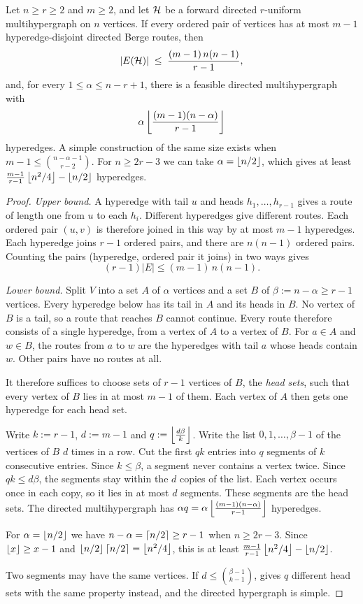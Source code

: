 \begin{proposition}\label{prop:dir-hyper-first}
Let $n\ge r\ge2$ and $m\ge2$, and let $\mathcal{H}$ be a forward directed $r$-uniform multihypergraph on $n$ vertices. If every ordered pair of vertices has at most $m-1$ hyperedge-disjoint directed Berge routes, then
\[
    |E(\mathcal{H})| \;\le\; \frac{(m-1)\,n(n-1)}{r-1},
\]
and, for every $1\le\alpha\le n-r+1$, there is a feasible directed
multihypergraph with
\[
    \alpha\left\lfloor \frac{(m-1)(n-\alpha)}{r-1} \right\rfloor
\]
hyperedges. A simple construction of the same size exists when $m-1\le\binom{n-\alpha-1}{r-2}$. For $n\ge2r-3$ we can take $\alpha=\left\lfloor n/2 \right\rfloor$, which gives at least $\frac{m-1}{r-1}\left\lfloor n^2/4 \right\rfloor-\left\lfloor n/2 \right\rfloor$ hyperedges.
\end{proposition}

\begin{proof}
\emph{Upper bound.} A hyperedge with tail $u$ and heads $h_1,\dots,h_{r-1}$ gives a route of length one from $u$ to each $h_i$.
Different hyperedges give different routes.
Each ordered pair $(u,v)$ is therefore joined in this way by at most $m-1$ hyperedges.
Each hyperedge joins $r-1$ ordered pairs, and there are $n(n-1)$ ordered pairs.
Counting the pairs (hyperedge, ordered pair it joins) in two ways gives
\[
    (r-1)|E| \le (m-1)\,n(n-1).
\]

\emph{Lower bound.} Split $V$ into a set $A$ of $\alpha$ vertices and a set $B$ of $\beta:=n-\alpha\ge r-1$ vertices.
Every hyperedge below has its tail in $A$ and its heads in $B$.
No vertex of $B$ is a tail, so a route that reaches $B$ cannot continue.
Every route therefore consists of a single hyperedge, from a vertex of $A$ to a vertex of $B$.
For $a\in A$ and $w\in B$, the routes from $a$ to $w$ are the hyperedges with tail $a$ whose heads contain $w$.
Other pairs have no routes at all.

It therefore suffices to choose sets of $r-1$ vertices of $B$, the \emph{head sets}, such that every vertex of $B$ lies in at most $m-1$ of them.
Each vertex of $A$ then gets one hyperedge for each head set.

Write $k:=r-1$, $d:=m-1$ and $q:=\left\lfloor \frac{d\beta}{k} \right\rfloor$.
Write the list $0,1,\dots,\beta-1$ of the vertices of $B$ $d$ times in a row.
Cut the first $qk$ entries into $q$ segments of $k$ consecutive entries.
Since $k\le\beta$, a segment never contains a vertex twice.
Since $qk\le d\beta$, the segments stay within the $d$ copies of the list.
Each vertex occurs once in each copy, so it lies in at most $d$ segments.
These segments are the head sets.
The directed multihypergraph has $\alpha q=\alpha\left\lfloor \frac{(m-1)(n-\alpha)}{r-1} \right\rfloor$ hyperedges.

For $\alpha=\left\lfloor n/2 \right\rfloor$ we have $n-\alpha=\left\lceil n/2 \right\rceil\ge r-1$ when $n\ge2r-3$. Since $\left\lfloor x \right\rfloor\ge x-1$ and $\left\lfloor n/2 \right\rfloor\left\lceil n/2 \right\rceil=\left\lfloor n^2/4 \right\rfloor$, this is at least $\frac{m-1}{r-1}\left\lfloor n^2/4 \right\rfloor-\left\lfloor n/2 \right\rfloor$.

Two segments may have the same vertices.
If $d\le\binom{\beta-1}{k-1}$,  gives $q$ different head sets with the same property instead, and the directed hypergraph is simple.
\end{proof}

